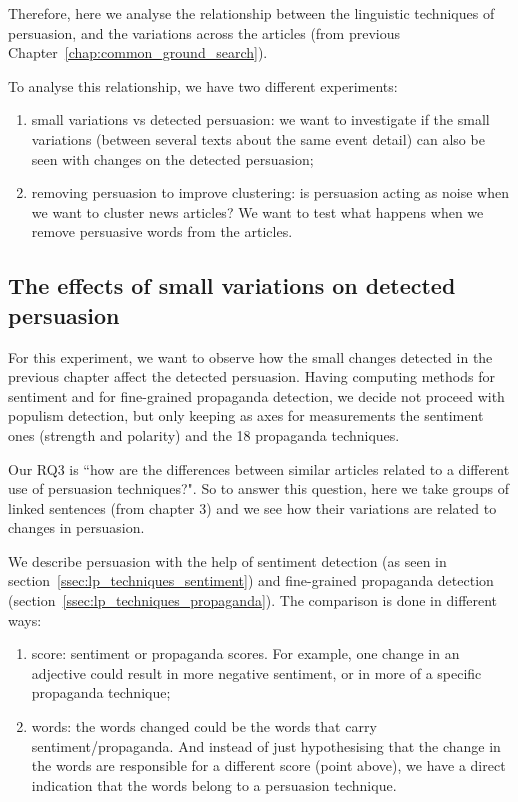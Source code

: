 Therefore, here we analyse the relationship between the linguistic techniques of persuasion, and the variations across the articles (from previous Chapter~\ref{chap:common_ground_search}).

To analyse this relationship, we have two different experiments:

\begin{enumerate}
    \item small variations vs detected persuasion: we want to investigate if the small variations (between several texts about the same event detail) can also be seen with changes on the detected persuasion; 
    \item removing persuasion to improve clustering: is persuasion acting as noise when we want to cluster news articles? We want to test what happens when we remove persuasive words from the articles.
\end{enumerate}

\subsection{\statusorange The effects of small variations on detected persuasion}
\label{ssec:lp_relationship_small_variations}

For this experiment, we want to observe how the small changes detected in the previous chapter affect the detected persuasion.
Having computing methods for sentiment and for fine-grained propaganda detection, we decide not proceed with populism detection, but only keeping as axes for measurements the sentiment ones (strength and polarity) and the 18 propaganda techniques.

Our RQ3 is ``how are the differences between similar articles related to a different use of persuasion techniques?".
So to answer this question, here we take groups of linked sentences (from chapter 3) and we see how their variations are related to changes in persuasion.

We describe persuasion with the help of sentiment detection (as seen in section~\ref{ssec:lp_techniques_sentiment}) and fine-grained propaganda detection (section~\ref{ssec:lp_techniques_propaganda}).
The comparison is done in different ways:
\begin{enumerate}
    \item score: sentiment or propaganda scores. For example, one change in an adjective could result in more negative sentiment, or in more of a specific propaganda technique;
    \item words: the words changed could be the words that carry sentiment/propaganda. And instead of just hypothesising that the change in the words are responsible for a different score (point above), we have a direct indication that the words belong to a persuasion technique.
\end{enumerate}

